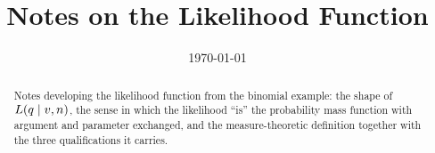 \documentclass[11pt]{article}
\title{Notes on the Likelihood Function}
\date{\today}
\begin{document}
\maketitle

\begin{abstract}
Notes developing the likelihood function from the binomial example: the shape of
$L(q \mid v, n)$, the sense in which the likelihood ``is'' the probability
mass function with argument and parameter exchanged, and the measure-theoretic
definition together with the three qualifications it carries.
\end{abstract}

\tableofcontents
\bigskip




\end{document}
